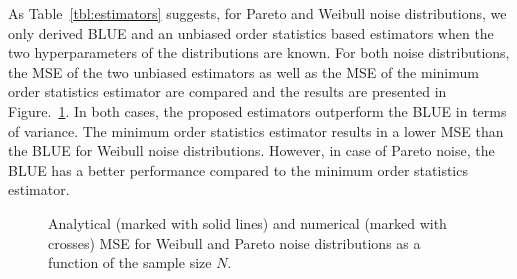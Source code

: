 \documentclass{article}
\begin{document}
As Table~\ref{tbl:estimators} suggests, for Pareto and Weibull noise distributions, we only derived BLUE and an unbiased order statistics based estimators when the two hyperparameters of the distributions are known. For both noise distributions, the MSE of the two unbiased estimators as well as the MSE of the minimum order statistics estimator are compared and the results are presented in Figure.~\ref{fig:pareto_weibull_blue_order}. In both cases, the proposed estimators outperform the BLUE in terms of variance. The minimum order statistics estimator results in a lower MSE than the BLUE for Weibull noise distributions. However, in case of Pareto noise, the BLUE has a better performance compared to the minimum order statistics estimator.
%
%
\begin{figure}[t]
	\centering
	\hfil
	\caption{Analytical (marked with solid lines) and numerical (marked with crosses) MSE for Weibull and Pareto noise distributions as a function of the sample size $N$.}
	\label{fig:pareto_weibull_blue_order}
\end{figure}
%
%
\end{document}
